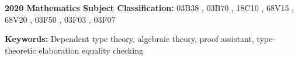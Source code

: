 \noindent\textbf{\textup{2020} Mathematics Subject Classification:}
  03B38%
, 03B70%
, 18C10%
, 68V15%
, 68V20%
, 03F50%
, 03F03%
, 03F07


\noindent\textbf{Keywords:}
Dependent type theory,
algebraic theory,
proof assistant,
type-theoretic elaboration
equality checking
